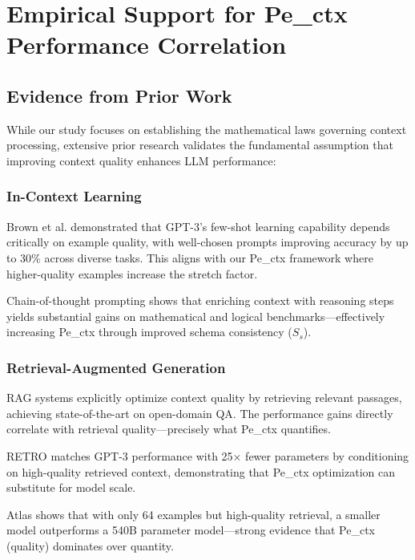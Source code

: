 \documentclass[conference]{IEEEtran}
\begin{document}
\section{Empirical Support for Pe\_ctx Performance Correlation}

\subsection{Evidence from Prior Work}

While our study focuses on establishing the mathematical laws governing context processing, extensive prior research validates the fundamental assumption that improving context quality enhances LLM performance:

\subsubsection{In-Context Learning}

Brown et al. \cite{brown2020language} demonstrated that GPT-3's few-shot learning capability depends critically on example quality, with well-chosen prompts improving accuracy by up to 30\% across diverse tasks. This aligns with our Pe\_ctx framework where higher-quality examples increase the stretch factor.

Chain-of-thought prompting \cite{wei2022chain} shows that enriching context with reasoning steps yields substantial gains on mathematical and logical benchmarks—effectively increasing Pe\_ctx through improved schema consistency ($S_s$).

\subsubsection{Retrieval-Augmented Generation}

RAG systems \cite{lewis2020retrieval} explicitly optimize context quality by retrieving relevant passages, achieving state-of-the-art on open-domain QA. The performance gains directly correlate with retrieval quality—precisely what Pe\_ctx quantifies.

RETRO \cite{borgeaud2021retro} matches GPT-3 performance with 25× fewer parameters by conditioning on high-quality retrieved context, demonstrating that Pe\_ctx optimization can substitute for model scale.

Atlas \cite{izacard2023atlas} shows that with only 64 examples but high-quality retrieval, a smaller model outperforms a 540B parameter model—strong evidence that Pe\_ctx (quality) dominates over quantity.
\end{document}

